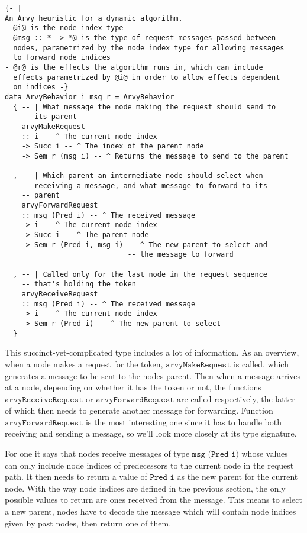\documentclass[a4paper, oneside]{discothesis}
\begin{document}
\begin{verbatim}
{- |
An Arvy heuristic for a dynamic algorithm.
- @i@ is the node index type
- @msg :: * -> *@ is the type of request messages passed between
  nodes, parametrized by the node index type for allowing messages
  to forward node indices
- @r@ is the effects the algorithm runs in, which can include
  effects parametrized by @i@ in order to allow effects dependent
  on indices -}
data ArvyBehavior i msg r = ArvyBehavior
  { -- | What message the node making the request should send to
    -- its parent
    arvyMakeRequest
    :: i -- ^ The current node index
    -> Succ i -- ^ The index of the parent node
    -> Sem r (msg i) -- ^ Returns the message to send to the parent

  , -- | Which parent an intermediate node should select when
    -- receiving a message, and what message to forward to its
    -- parent
    arvyForwardRequest
    :: msg (Pred i) -- ^ The received message
    -> i -- ^ The current node index
    -> Succ i -- ^ The parent node
    -> Sem r (Pred i, msg i) -- ^ The new parent to select and
                             -- the message to forward

  , -- | Called only for the last node in the request sequence
    -- that's holding the token
    arvyReceiveRequest
    :: msg (Pred i) -- ^ The received message
    -> i -- ^ The current node index
    -> Sem r (Pred i) -- ^ The new parent to select
  }
\end{verbatim}

This succinct-yet-complicated type includes a lot of information. As an overview, when a node makes a request for the token, $\texttt{arvyMakeRequest}$ is called, which generates a message to be sent to the nodes parent. Then when a message arrives at a node, depending on whether it has the token or not, the functions $\texttt{arvyReceiveRequest}$ or $\texttt{arvyForwardRequest}$ are called respectively, the latter of which then needs to generate another message for forwarding. Function $\texttt{arvyForwardRequest}$ is the most interesting one since it has to handle both receiving and sending a message, so we'll look more closely at its type signature.

For one it says that nodes receive messages of type $\texttt{msg (Pred i)}$ whose values can only include node indices of predecessors to the current node in the request path. It then needs to return a value of $\texttt{Pred i}$ as the new parent for the current node. With the way node indices are defined in the previous section, the only possible values to return are ones received from the message. This means to select a new parent, nodes have to decode the message which will contain node indices given by past nodes, then return one of them.
\end{document}
